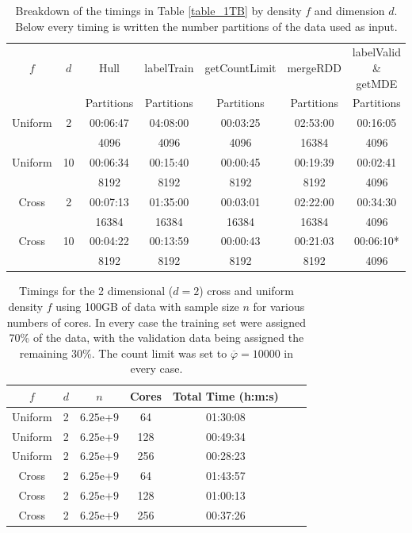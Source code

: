 \documentclass{report}
\begin{document}
\begin{table}[htbp]
\begin{center}
\scriptsize{
\begin{tabular}{|c  c  | c | c  | c | c | c |}
	\hline
	$f$ &  $d$ & Hull & labelTrain & getCountLimit & mergeRDD & labelValid \& getMDE \\
	  & & Partitions & Partitions & Partitions & Partitions & Partitions \\
	\hline
	Uniform 	& 2  & 00:06:47 & 04:08:00 & 00:03:25 & 02:53:00 & 00:16:05  \\
	 	        &    & 4096 & 4096 & 4096 & 16384 & 4096  \\
	\hline
	Uniform 	& 10 & 00:06:34 & 00:15:40 & 00:00:45 & 00:19:39 & 00:02:41  \\
	 	        &    & 8192 & 8192 & 8192 & 8192 & 4096 \\
	\hline
	\hline                                                        
	Cross	  	& 2 & 00:07:13 & 01:35:00 & 00:03:01 & 02:22:00 & 00:34:30 \\
	  		&   & 16384 & 16384 & 16384 & 16384 & 4096  \\
	\hline
	Cross  		& 10 & 00:04:22 & 00:13:59 & 00:00:43 & 00:21:03 & 00:06:10*  \\
	 	        &    & 8192 & 8192 & 8192 & 8192 & 4096 \\
	\hline
\end{tabular}
}
\caption{Breakdown of the timings in Table \ref{table_1TB} by density $f$ and dimension $d$. Below every timing is written the number partitions of the data used as input.}
\label{breakdown_table_1TB}
\end{center}
\end{table}

\begin{table}[htbp]
\begin{center}
\begin{tabular}{|c  c  c | c | c | c | c |}
	\hline
	$f$ &  $d$ & $n$ & Cores &  Total Time (h:m:s) \\
	\hline
	Uniform & 2 & $6.25$e+$9$ & 64   & 01:30:08 \\
	Uniform & 2 & $6.25$e+$9$ & 128  & 00:49:34 \\
	Uniform & 2 & $6.25$e+$9$ & 256  & 00:28:23 \\
	\hline
	\hline
	Cross  & 2 & $6.25$e+$9$ & 64    & 01:43:57 \\
	Cross  & 2 & $6.25$e+$9$ & 128   & 01:00:13 \\
	Cross  & 2 & $6.25$e+$9$ & 256   & 00:37:26 \\
	\hline
\end{tabular}
\end{center}
\caption{Timings for the 2 dimensional ($d=2$) cross and uniform density $f$ using 100GB of data with sample size $n$ for various numbers of cores. In every case the training set were assigned 70\% of the data, with the validation data being assigned the remaining 30\%.
The count limit was set to $\overline{\varphi} = 10000$ in every case.}
\label{scale_table_100GB}
\end{table}
\end{document}
